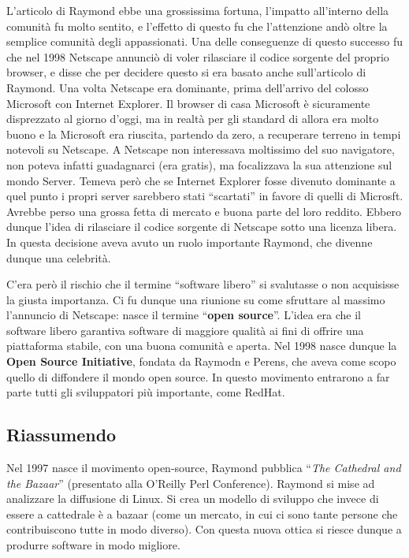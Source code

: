 L'articolo di Raymond ebbe una grossissima fortuna, l'impatto all'interno della comunità fu molto sentito, e l'effetto di questo fu che l'attenzione andò oltre la semplice comunità degli appassionati. Una delle conseguenze di questo successo fu che nel 1998 Netscape annunciò di voler rilasciare il codice sorgente del proprio browser, e disse che per decidere questo si era basato anche sull'articolo di Raymond. Una volta Netscape era dominante, prima dell'arrivo del colosso Microsoft con Internet Explorer. Il browser di casa Microsoft è sicuramente disprezzato al giorno d'oggi, ma in realtà per gli standard di allora era molto buono e la Microsoft era riuscita, partendo da zero, a recuperare terreno in tempi notevoli su Netscape. A Netscape non interessava moltissimo del suo navigatore, non poteva infatti guadagnarci (era gratis), ma focalizzava la sua attenzione sul mondo Server. Temeva però che se Internet Explorer fosse divenuto dominante a quel punto i propri server sarebbero stati ``scartati'' in favore di quelli di Microsft. Avrebbe perso una grossa fetta di mercato e buona parte del loro reddito. Ebbero dunque l'idea di rilasciare il codice sorgente di Netscape sotto una licenza libera. In questa decisione aveva avuto un ruolo importante Raymond, che divenne dunque una celebrità.

C'era però il rischio che il termine ``software libero'' si svalutasse o non acquisisse la giusta importanza. Ci fu dunque una riunione su come sfruttare al massimo l'annuncio di Netscape: nasce il termine ``\textbf{open source}''. L'idea era che il software libero garantiva software di maggiore qualità ai fini di offrire una piattaforma stabile, con una buona comunità e aperta. Nel 1998 nasce dunque la \textbf{Open Source Initiative}, fondata da Raymodn e Perens, che aveva come scopo quello di diffondere il mondo open source. In questo movimento entrarono a far parte tutti gli sviluppatori più importante, come RedHat. 

\subsection{Riassumendo}

Nel 1997 nasce il movimento open-source, Raymond pubblica ``\textit{The Cathedral and the Bazaar}'' (presentato alla O'Reilly Perl Conference). Raymond si mise ad analizzare la diffusione di Linux. Si crea un modello di sviluppo che invece di essere a cattedrale è a bazaar (come un mercato, in cui ci sono tante persone che contribuiscono tutte in modo diverso). Con questa nuova ottica si riesce dunque a produrre software in modo migliore.

